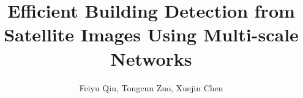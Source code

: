 \documentclass[journal]{IEEEtran}
\begin{document}
\title{Efficient Building Detection from Satellite Images Using Multi-scale Networks}
%
%
%
\author{Feiyu Qin,
       Tongcun Zuo,
       Xuejin Chen}%

\maketitle










\end{document}
